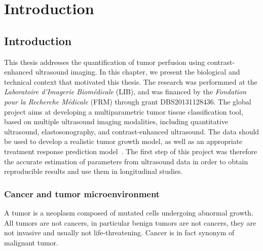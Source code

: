 \part*{Introduction}
\chapter{Introduction}\label{chapter:intro}
This thesis addresses the quantification of tumor perfusion using contrast-enhanced ultrasound imaging.
In this chapter, we present the biological and technical context that motivated this thesis.
The research was performmed at the {\em Laboratoire d'Imagerie Biom\'edicale} (LIB), and was financed by the {\em Fondation pour la Recherche M\'edicale} (FRM) through grant DBS20131128436.
The global project aims at developing a multiparametric tumor tissue classification tool, based on multiple ultrasound imaging modalities, including quantitative ultrasound, elastosonography, and contrast-enhanced ultrasound.
The data should be used to develop a realistic tumor growth model, as well as an appropriate treatment response prediction model~\cite{Ribba:2011cl}.
The first step of this project was therefore the accurate estimation of parameters from ultrasound data in order to obtain reproducible results and use them in longitudinal studies.

\section{Cancer and tumor microenvironment}
\label{sec:IntroCancer}
A tumor is a neoplasm composed of mutated cells undergoing abnormal growth.
All tumors are not cancers, in particular benign tumors are not cancers, they are not invasive and usually not life-threatening.
Cancer is in fact synonym of malignant tumor.

